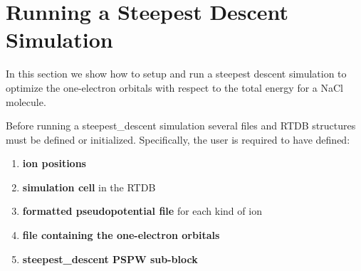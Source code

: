 \section{Running a Steepest Descent Simulation}
\label{sec:pspw_sd}

In this section we show how to setup and run a steepest descent
simulation to optimize the one-electron orbitals with respect to 
the total energy for a NaCl molecule.  

Before running a steepest\_descent simulation several files and
RTDB structures must be defined or initialized.  Specifically, the user 
is required to have defined:
\begin{enumerate}
  \item {\bf ion positions} 
  \item {\bf simulation cell} in the RTDB 
  \item {\bf formatted pseudopotential file} for each kind of ion 
  \item {\bf file containing the one-electron orbitals} 
  \item {\bf steepest\_descent PSPW sub-block} 
\end{enumerate}

